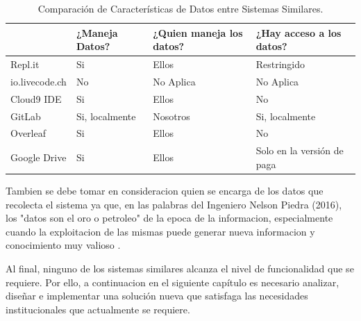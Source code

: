 \begin{table}[h!]
	\small
    \begin{tabular}{|p{}|p{}|p{}|p{}|}
      \hline
              			& ¿Maneja Datos?	& ¿Quien maneja los \mbox{datos}?	& ¿Hay acceso a los \mbox{datos}?	\\
      \hline
      Repl.it			&	Si				&	Ellos			& Restringido						\\
      \hline
      io.livecode.ch	&	No				&	No Aplica		& No Aplica							\\
      \hline
      Cloud9 IDE		&	Si				&	Ellos			& No								\\
      \hline
      GitLab			&	Si, localmente	&	Nosotros		& Si, localmente					\\
      \hline
      Overleaf			&	Si				&	Ellos			& No								\\
      \hline
      Google Drive		&	Si				&	Ellos			& Solo en la versión de paga		\\
      \hline
    \end{tabular}
	\caption{Comparación de Características de Datos entre \mbox{Sistemas} Similares.}
    \label{comparacion-sistemas-similares-4}
\end{table}

Tambien se debe tomar en consideracion quien se encarga de los datos que recolecta el sistema ya que, en las palabras del Ingeniero Nelson Piedra (2016), los "datos son el oro o petroleo" de la epoca de la informacion, especialmente cuando la exploitacion de las mismas puede generar nueva informacion y conocimiento muy valioso \citep{Piedra-Nelson-BLD} \citep{} \citep{Lopez-Jorge} \citep{Lopez-Jorge-ArqApp}.

Al final, ninguno de los sistemas similares alcanza el nivel de funcionalidad que se requiere. Por ello, a continuacion en el siguiente capítulo es necesario analizar, diseñar e implementar una solución nueva que satisfaga las necesidades institucionales que actualmente se requiere.

